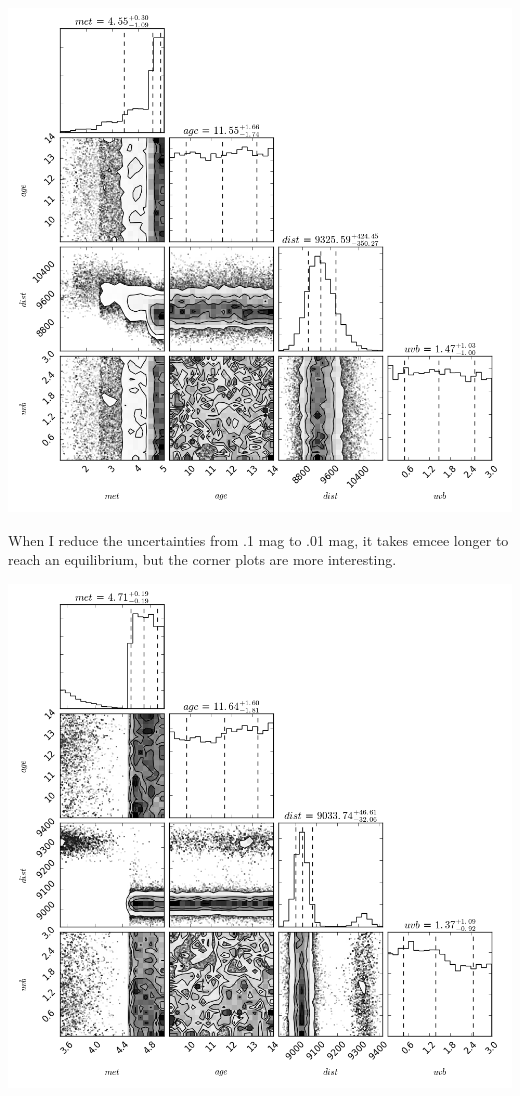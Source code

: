 \documentclass[letterpaper,12pt]{article}
\begin{document}
\includegraphics[width=5.5in]{corner11}

When I reduce the uncertainties from .1 mag to .01 mag, it takes emcee longer to reach an equilibrium, but the corner plots are more interesting. 

\includegraphics[width=5.5in]{corner21}
\end{document}
